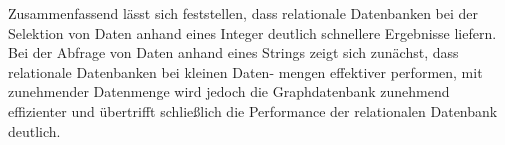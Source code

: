 \noindent
Zusammenfassend lässt sich feststellen, dass relationale Datenbanken bei der Selektion von Daten anhand eines Integer deutlich schnellere Ergebnisse liefern. Bei der Abfrage von Daten anhand eines Strings zeigt sich zunächst, dass relationale Datenbanken bei kleinen Daten- mengen effektiver performen, mit zunehmender Datenmenge wird jedoch die Graphdatenbank zunehmend effizienter und übertrifft schließlich die Performance der relationalen Datenbank deutlich.
